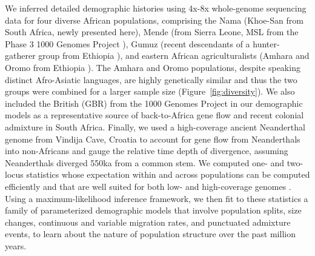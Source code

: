 \documentclass[]{article}
\begin{document}
We inferred detailed demographic histories using 4x-8x whole-genome sequencing
data for four diverse African populations, comprising the Nama (Khoe-San from
South Africa, newly presented here), Mende (from Sierra Leone, MSL from the
Phase 3 1000 Genomes Project \citep{1000_Genomes_Project_Consortium2015-zq}),
Gumuz (recent descendants of a hunter-gatherer group from Ethiopia
\citep{Gurdasani2015-qy,Gopalan2022-pw}), and eastern African agriculturalists
(Amhara and Oromo from Ethiopia \citep{Gurdasani2015-qy}). The Amhara and Oromo
populations, despite speaking distinct Afro-Asiatic languages, are highly
genetically similar \citep{Pagani2015-pz,Gopalan2022-pw} and thus the two
groups were combined for a larger sample size (Figure~\ref{fig:diversity}). We also
included the British (GBR) from the 1000 Genomes Project in our demographic
models as a representative source of back-to-Africa gene flow and recent
colonial admixture in South Africa. Finally, we used a high-coverage ancient
Neanderthal genome from Vindija Cave, Croatia \citep{Prufer2017-kk} to account
for gene flow from Neanderthals into non-Africans and gauge the relative
time depth of divergence, assuming Neanderthals diverged 550ka from a common
stem. We computed one- and two-locus statistics whose expectation within and across 
populations can be computed efficiently and that are well suited for both low- and
high-coverage genomes \citep{Ragsdale2019-nt,Ragsdale2020-nz}. Using a
maximum-likelihood inference framework, we then fit to these statistics a
family of parameterized demographic models that involve population splits, size
changes, continuous and variable migration rates, and punctuated admixture
events, to learn about the nature of population structure over the past million
years.
\end{document}
